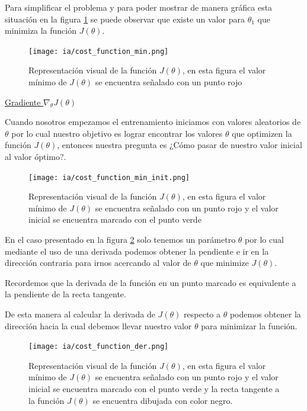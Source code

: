 \documentclass[11pt,fleqn]{book} %
\begin{document}
Para simplificar el problema y para poder mostrar de manera gráfica esta situación en la figura \ref{fig:cost_function_min} se puede observar que existe un valor para $\theta_1$ que minimiza la función $J(\theta)$.


\begin{figure}[ht]
\centering\texttt{[image: ia/cost\_function\_min.png]}
\caption{Representación visual de la función $J(\theta)$, en esta figura el valor mínimo de $J(\theta)$ se encuentra señalado con un punto rojo}

\label{fig:cost_function_min} 
\end{figure}

\underline{Gradiente $\nabla _{\theta} J(\theta)$}

Cuando nosotros empezamos el entrenamiento iniciamos con valores aleatorios de $\theta$ por lo cual nuestro objetivo es lograr encontrar los valores $\theta$ que optimizen la función  $J(\theta)$, entonces nuestra pregunta es ¿Cómo pasar de nuestro valor inicial al valor óptimo?.

\begin{figure}[ht]
\centering\texttt{[image: ia/cost\_function\_min\_init.png]}
\caption{Representación visual de la función $J(\theta)$, en esta figura el valor mínimo de $J(\theta)$ se encuentra señalado con un punto rojo y el valor inicial se encuentra marcado con el punto verde}

\label{fig:cost_function_min_init} 
\end{figure}

En el caso presentado en la figura \ref{fig:cost_function_min_init} solo tenemos un parámetro $\theta$ por lo cual mediante el uso de una derivada podemos obtener la pendiente e ir en la dirección contraria para irnos acercando al valor de $\theta$ que minimize $J(\theta)$.

Recordemos que la derivada de la función en un punto marcado es equivalente a la pendiente de la recta tangente.

De esta manera al calcular la derivada de $J(\theta)$ respecto a $\theta$ podemos obtener la dirección hacia la cual debemos llevar nuestro valor $\theta$ para minimizar la función.

\begin{figure}[ht]
\centering\texttt{[image: ia/cost\_function\_der.png]}
\caption{Representación visual de la función $J(\theta)$, en esta figura el valor mínimo de $J(\theta)$ se encuentra señalado con un punto rojo y el valor inicial se encuentra marcado con el punto verde y la recta tangente a la función $J(\theta)$ se encuentra dibujada con color negro.}

\label{fig:cost_function_der} 
\end{figure}
\end{document}
